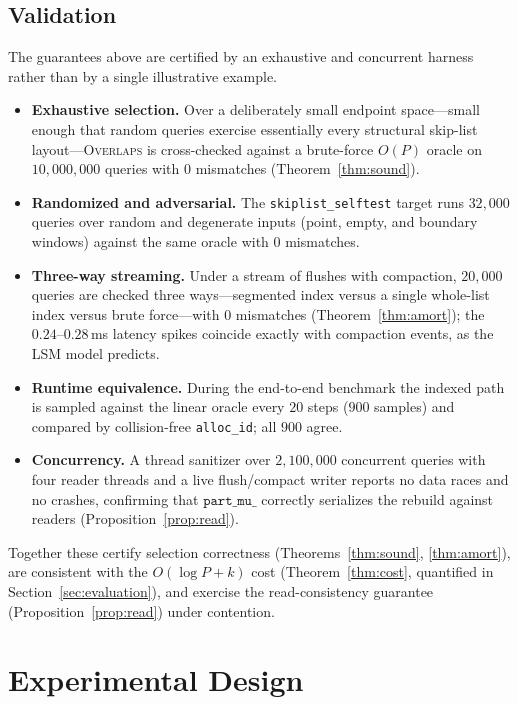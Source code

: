 \documentclass[10pt]{article}
\theoremstyle{definition}
\begin{document}
\subsection{Validation}
\label{sec:validation}

The guarantees above are certified by an exhaustive and concurrent harness rather
than by a single illustrative example.
\begin{itemize}
\item \textbf{Exhaustive selection.} Over a deliberately small endpoint
  space---small enough that random queries exercise essentially every structural
  skip-list layout---\textsc{Overlaps} is cross-checked against a brute-force $O(P)$
  oracle on $10{,}000{,}000$ queries with $0$ mismatches (Theorem~\ref{thm:sound}).
\item \textbf{Randomized and adversarial.} The \texttt{skiplist\_selftest} target
  runs $32{,}000$ queries over random and degenerate inputs (point, empty, and
  boundary windows) against the same oracle with $0$ mismatches.
\item \textbf{Three-way streaming.} Under a stream of flushes with compaction,
  $20{,}000$ queries are checked three ways---segmented index versus a single
  whole-list index versus brute force---with $0$ mismatches (Theorem~\ref{thm:amort});
  the $0.24$--$0.28$\,ms latency spikes coincide exactly with compaction events, as
  the LSM model predicts.
\item \textbf{Runtime equivalence.} During the end-to-end benchmark the indexed path
  is sampled against the linear oracle every $20$ steps ($900$ samples) and compared
  by collision-free \texttt{alloc\_id}; all $900$ agree.
\item \textbf{Concurrency.} A thread sanitizer over $2{,}100{,}000$ concurrent
  queries with four reader threads and a live flush/compact writer reports no data
  races and no crashes, confirming that $\texttt{part\_mu\_}$ correctly serializes
  the rebuild against readers (Proposition~\ref{prop:read}).
\end{itemize}
Together these certify selection correctness (Theorems~\ref{thm:sound},
\ref{thm:amort}), are consistent with the $O(\log P + k)$ cost
(Theorem~\ref{thm:cost}, quantified in Section~\ref{sec:evaluation}), and exercise
the read-consistency guarantee (Proposition~\ref{prop:read}) under contention.

\section{Experimental Design}
\label{sec:expdesign}
\end{document}
